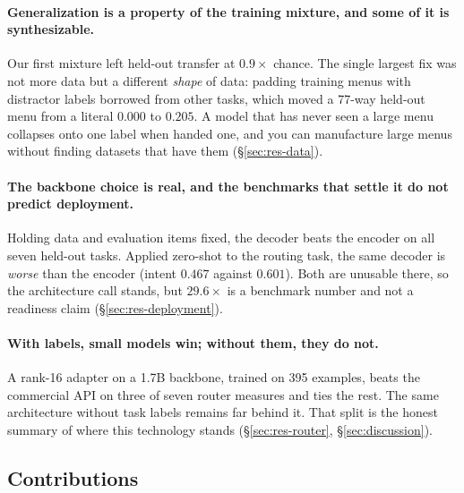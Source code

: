 \paragraph{Generalization is a property of the training mixture, and some
of it is synthesizable.} Our first mixture left held-out transfer at
$0.9\times$ chance. The single largest fix was not more data but a
different \emph{shape} of data: padding training menus with distractor
labels borrowed from other tasks, which moved a 77-way held-out menu from a
literal $0.000$ to $0.205$. A model that has never seen a large menu
collapses onto one label when handed one, and you can manufacture large
menus without finding datasets that have them (\S\ref{sec:res-data}).

\paragraph{The backbone choice is real, and the benchmarks that settle it
do not predict deployment.} Holding data and evaluation items fixed, the
decoder beats the encoder on all seven held-out tasks. Applied zero-shot
to the routing task, the same decoder is \emph{worse} than the encoder
(intent $0.467$ against $0.601$). Both are unusable there, so the
architecture call stands, but $29.6\times$ is a benchmark number and not
a readiness claim (\S\ref{sec:res-deployment}).

\paragraph{With labels, small models win; without them, they do not.} A
rank-16 adapter on a 1.7B backbone, trained on 395 examples, beats the
commercial API on three of seven router measures and ties the rest. The
same architecture without task labels remains far behind it. That split is
the honest summary of where this technology stands
(\S\ref{sec:res-router}, \S\ref{sec:discussion}).

\subsection{Contributions}

